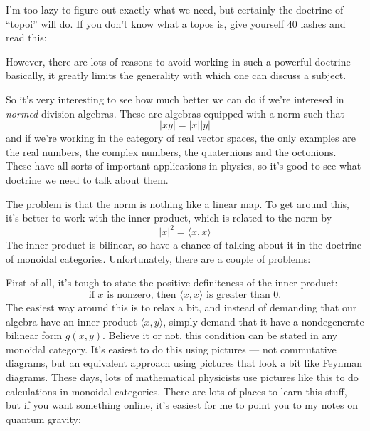 \documentclass{article}
\def\tightlist{}
\renewcommand{\texttt}[1]{%
  \begingroup
  \ttfamily
  \begingroup\lccode`~=`/\lowercase{\endgroup\def~}{/\discretionary{}{}{}}%
  \begingroup\lccode`~=`[\lowercase{\endgroup\def~}{[\discretionary{}{}{}}%
  \begingroup\lccode`~=`.\lowercase{\endgroup\def~}{.\discretionary{}{}{}}%
  \catcode`/=\active\catcode`[=\active\catcode`.=\active
  \scantokens{#1\noexpand}%
  \endgroup
}
\begin{document}
I'm too lazy to figure out exactly what we need, but certainly the
doctrine of ``topoi'' will do. If you don't know what a topos is, give
yourself 40 lashes and read this:


However, there are lots of reasons to avoid working in such a powerful
doctrine --- basically, it greatly limits the generality with which one
can discuss a subject.

So it's very interesting to see how much better we can do if we're
interesed in \emph{normed} division algebras. These are algebras
equipped with a norm such that \[|xy| = |x| |y|\] and if we're working
in the category of real vector spaces, the only examples are the real
numbers, the complex numbers, the quaternions and the octonions. These
have all sorts of important applications in physics, so it's good to see
what doctrine we need to talk about them.

The problem is that the norm is nothing like a linear map. To get around
this, it's better to work with the inner product, which is related to
the norm by \[|x|^2 = \langle x,x\rangle\] The inner product is
bilinear, so have a chance of talking about it in the doctrine of
monoidal categories. Unfortunately, there are a couple of problems:

First of all, it's tough to state the positive definiteness of the inner
product:
\[\mbox{if $x$ is nonzero, then $\langle x,x\rangle$ is greater than $0$.}\]
The easiest way around this is to relax a bit, and instead of demanding
that our algebra have an inner product \(\langle x,y\rangle\), simply
demand that it have a nondegenerate bilinear form \(g(x,y)\). Believe it
or not, this condition can be stated in any monoidal category. It's
easiest to do this using pictures --- not commutative diagrams, but an
equivalent approach using pictures that look a bit like Feynman
diagrams. These days, lots of mathematical physicists use pictures like
this to do calculations in monoidal categories. There are lots of places
to learn this stuff, but if you want something online, it's easiest for
me to point you to my notes on quantum gravity:

\end{document}
